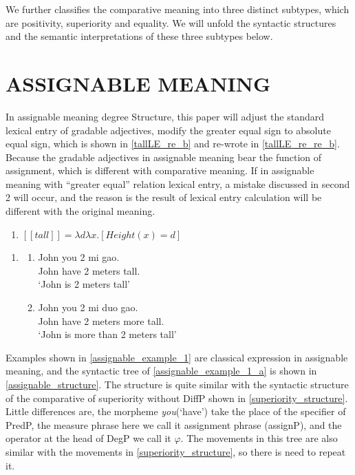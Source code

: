\documentclass{ctexart}
\begin{document}
We further classifies the comparative meaning into three distinct subtypes, which are positivity, superiority and equality. We will unfold the syntactic structures and the semantic interpretations of these three subtypes below.

\section{ASSIGNABLE MEANING}

In assignable meaning degree Structure, this paper will adjust the standard lexical entry of gradable adjectives, modify the greater equal sign to absolute equal sign, which is shown in \ref{tallLE_re_b} and re-wrote in \ref{tallLE_re_re_b}. Because the gradable adjectives in assignable meaning bear the function of assignment, which is different with comparative meaning. If in assignable meaning with ``greater equal'' relation lexical entry, a mistake discussed in second 2 will occur, and the reason is the result of lexical entry calculation will be different with the original meaning. 

\begin{enumerate}
    \item \label{tallLE_re_re_b}
    $[\![tall]\!]=\lambda d \lambda x.[Height(x) = d]$
\end{enumerate}

\begin{enumerate}
    \item \label{assignable_example_1}
    \begin{enumerate}
        \item \label{assignable_example_1_a}
        John you 2 mi gao. \\
        John have 2 meters tall. \\
        `John is 2 meters tall'
        
        \item \label{assignable_example_1_b}
        John you 2 mi duo gao. \\
        John have 2 meters more tall. \\
        `John is more than 2 meters tall'
        
    \end{enumerate}
\end{enumerate}

Examples shown in \ref{assignable_example_1} are classical expression in assignable meaning, and the syntactic tree of \ref{assignable_example_1_a} is shown in \ref{assignable_structure}. The structure is quite similar with the syntactic structure of the comparative of superiority without DiffP shown in \ref{superiority_structure}. Little differences are, the morpheme \textit{you}(`have') take the place of the specifier of PredP, the measure phrase here we call it assignment phrase (assignP), and the operator at the head of DegP we call it $\varphi$. The movements in this tree are also similar with the movements in \ref{superiority_structure}, so there is need to repeat it.
\end{document}
